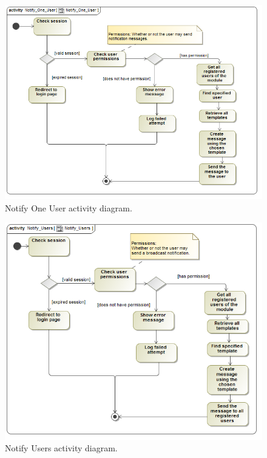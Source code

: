 \documentclass [a4paper,12pt] {article}
\begin{document}
			\begin{figure}[H]
				\centering
				\includegraphics[width=1.0\textwidth]{NotifyOneUserAD.png}
				\caption{Notify One User activity diagram.}
			\end{figure}
			\begin{figure}[H]
				\centering
				\includegraphics[width=1.0\textwidth]{NotifyUSersAD.png}
				\caption{Notify Users activity diagram.}
			\end{figure}
\end{document}
